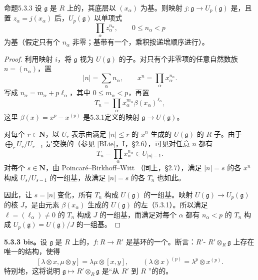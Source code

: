 \begin{SGAresult}{命题}{5.3.3}
设 $\mathfrak g$ 是 $R$ 上的，其底层以 $(x_\alpha)$ 为基。则映射 $j:\mathfrak g\to U_p(\mathfrak g)$ 是，且置 $z_\alpha=j(x_\alpha)$ 后，$U_p(\mathfrak g)$ 以单项式
\[
 \prod_\alpha z_\alpha^{n_\alpha},\qquad 0\le n_\alpha<p
\]
为基（假定只有个 $n_\alpha$ 非零；基带有一个，乘积按递增顺序进行）。
\end{SGAresult}
\begin{proof}
利用映射 $i$，将 $\mathfrak g$ 视为 $U(\mathfrak g)$ 的子。对只有个非零项的任意自然数族 $n=(n_\alpha)$，置
\[
 |n|=\sum_\alpha n_\alpha,\qquad x^n=\prod_\alpha x_\alpha^{n_\alpha}.
\]
写成 $n_\alpha=m_\alpha+p\ell_\alpha$，其中 $0\le m_\alpha<p$，再置
\[
 T_n=\prod_\alpha x_\alpha^{m_\alpha}\beta(x_\alpha)^{\ell_\alpha},
\]
这里 $\beta(x)=x^p-x^{(p)}$ 是5.3.1定义的映射 $\mathfrak g\to U(\mathfrak g)$。

对每个 $r\in\mathbf N$，以 $U_r$ 表示由满足 $|n|\le r$ 的 $x^n$ 生成的 $U(\mathfrak g)$ 的 $R$-子。由于 $\bigoplus_r U_r/U_{r-1}$ 是交换的（参见 [BLie]，I，\S2.6），可见对任意 $n$ 都有
\[
 T_n-\prod_\alpha x_\alpha^{n_\alpha}\in U_{|n|-1}.
\]
对每个 $s\in\mathbf N$，由 Poincaré--Birkhoff--Witt （同上，\S2.7），满足 $|n|=s$ 的各 $x^n$ 构成 $U_s/U_{s-1}$ 的一组基，故满足 $|n|=s$ 的各 $T_n$ 也如此。

因此，让 $s=|n|$ 变化，所有 $T_n$ 构成 $U(\mathfrak g)$ 的一组基。映射 $U(\mathfrak g)\to U_p(\mathfrak g)$ 的核 $J$，是由元素 $\beta(x_\alpha)$ 生成的 $U(\mathfrak g)$ 的左（5.3.1）。所以满足 $\ell=(\ell_\alpha)\ne0$ 的 $T_n$ 构成 $J$ 的一组基，而满足对每个 $\alpha$ 都有 $n_\alpha<p$ 的 $T_n$ 构成 $U_p(\mathfrak g)=U(\mathfrak g)/J$ 的一组基。
\end{proof}

\textbf{5.3.3 bis。}设 $\mathfrak g$ 是 $R$ 上的，$f:R\to R'$ 是基环的一个。断言：$R'$- $R'\otimes_R\mathfrak g$ 上存在唯一的结构，使得
\[
 [\lambda\otimes x,\mu\otimes y]=\lambda\mu\otimes[x,y],\qquad
 (\lambda\otimes x)^{(p)}=\lambda^p\otimes x^{(p)}.\tag{*}
\]
特别地，这将说明 $\mathfrak g\mapsto R'\otimes_R\mathfrak g$ 是“从 $R'$ 到 $R$ ”的的。

